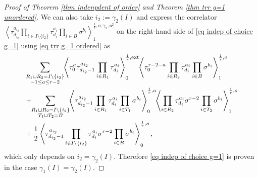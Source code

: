 \documentclass[11pt]{amsart}
\theoremstyle{definition}
\theoremstyle{remark}
\newcommand{\consta}{{\frac{1}{2}}}
\newcommand{\<}{\left<}
\renewcommand{\>}{\right>}
\numberwithin{equation}{section}
\begin{document}
\begin{proof}[Proof of Theorem \ref{thm indenpdent of order} and Theorem \ref{thm trr g=1 unordered}]
    We can also take $i_2:=\gamma_2(I)$ and express the correlator 
    $\left\langle \tau_{d_{i_2}}^{a_{i_2}}\prod_{i\in I\setminus \{i_2\}}\tau^{a_i}_{d_i}\prod_{i\in B}\sigma^{b_i}\right\rangle^{\frac{1}{r},o,\gamma_2,\bm{s}^2}_1$ on the right-hand side of \eqref{eq indep of choice g=1} using \eqref{eq trr g=1 ordered} as
    \begin{equation}\label{eq apply trr D>1 v2}
        \begin{split}
    &\sum_{\substack{R_1 \sqcup R_2 = I\setminus\{i_2\}\\ -1\le a \le r-2}}\hspace{-0.1cm}\left\langle \tau_0^{a}\tau_{d_{i_2}-1}^{a_{i_2}}\prod_{i \in R_1}\tau_{d_i}^{a_i}\right\rangle^{\frac{1}{r},\text{ext}}_0
    \hspace{-0.1cm}\left\langle \tau_0^{r-2-a}\prod_{i\in R_2}\tau^{a_i}_{d_i}\prod_{i\in B}\sigma^{b_i}\right\rangle^{\frac{1}{r},o}_1\\
    &+\hspace{-0.1cm}\sum_{\substack{R_1 \sqcup R_2 =  I\setminus\{i_2\} \\ T_1 \sqcup T_2 =  B}} \hspace{-0.1cm} \left\langle \tau^{a_{i_2}}_{d_{i_2}-1}\prod_{i \in R_1} \tau^{a_i}_{d_i}\prod_{i\in T_1}\sigma^{b_i}\right\rangle^{\frac{1}{r},o}_0 \hspace{-0.1cm}\left\langle \prod_{i \in R_2} \tau^{a_i}_{d_i} \sigma^{r-2}\prod_{i\in T_2}\sigma^{b_i}\right\rangle^{\frac{1}{r}, o}_1\\
    &+\consta\left\langle \tau^{a_{i_2}}_{d_{i_2}-1}\prod_{i\in I\setminus \{i_2\}}\tau^{a_i}_{d_i}\sigma^{r-2}\prod_{i\in B}\sigma^{b_i}\right\rangle^{\frac{1}{r},o}_0,
    \end{split}
    \end{equation}
    which only depends on $i_2=\gamma_2(I)$. Therefore \eqref{eq indep of choice g=1} is proven in the case $\gamma_1(I)=\gamma_2(I)$.


\end{proof}
\end{document}
